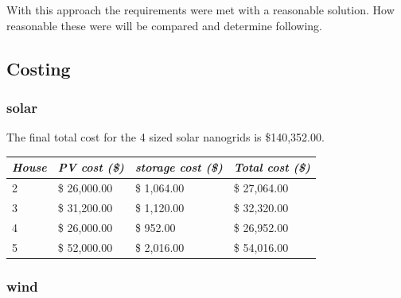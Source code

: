 \documentclass[journal]{IEEEtran}
\begin{document}
        With this approach the requirements were met with a reasonable solution. How reasonable these were will be compared and determine following.
        
        \newpage
        \subsection{Costing}
                \subsubsection*{solar}

                The final total cost for the 4 sized solar nanogrids is \$140,352.00.
                
                \begin{table}[h!]
                        \begin{tabular}{|l|l|l|l|}
                                \hline
                                \textit{\textbf{House}} & \textit{\textbf{PV cost (\$)}} & \textit{\textbf{storage cost (\$)}} & \textit{\textbf{Total cost (\$)}} \\ \hline
                                2                       & \$            26,000.00        & \$          1,064.00                & \$    27,064.00                   \\ \hline
                                3                       & \$            31,200.00        & \$          1,120.00                & \$    32,320.00                   \\ \hline
                                4                       & \$            26,000.00        & \$             952.00               & \$    26,952.00                   \\ \hline
                                5                       & \$            52,000.00        & \$          2,016.00                & \$    54,016.00                   \\ \hline
                        \end{tabular}
                \end{table}
                \subsubsection*{wind}
\end{document}
